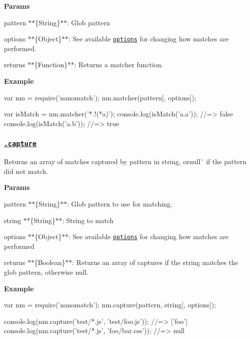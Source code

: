 {\bfseries Params}


\begin{DoxyItemize}
\item {\ttfamily pattern} $\ast$$\ast$\{String\}$\ast$$\ast$\+: Glob pattern
\item {\ttfamily options} $\ast$$\ast$\{Object\}$\ast$$\ast$\+: See available \href{#options}{\tt options} for changing how matches are performed.
\item {\ttfamily returns} $\ast$$\ast$\{Function\}$\ast$$\ast$\+: Returns a matcher function.
\end{DoxyItemize}

{\bfseries Example}


\begin{DoxyCode}
var nm = require('nanomatch');
nm.matcher(pattern[, options]);

var isMatch = nm.matcher('*.!(*a)');
console.log(isMatch('a.a'));
//=> false
console.log(isMatch('a.b'));
//=> true
\end{DoxyCode}


\subsubsection*{\href{index.js#L560}{\tt .capture}}

Returns an array of matches captured by {\ttfamily pattern} in {\ttfamily string, or}null\`{} if the pattern did not match.

{\bfseries Params}


\begin{DoxyItemize}
\item {\ttfamily pattern} $\ast$$\ast$\{String\}$\ast$$\ast$\+: Glob pattern to use for matching.
\item {\ttfamily string} $\ast$$\ast$\{String\}$\ast$$\ast$\+: String to match
\item {\ttfamily options} $\ast$$\ast$\{Object\}$\ast$$\ast$\+: See available \href{#options}{\tt options} for changing how matches are performed
\item {\ttfamily returns} $\ast$$\ast$\{Boolean\}$\ast$$\ast$\+: Returns an array of captures if the string matches the glob pattern, otherwise {\ttfamily null}.
\end{DoxyItemize}

{\bfseries Example}


\begin{DoxyCode}
var nm = require('nanomatch');
nm.capture(pattern, string[, options]);

console.log(nm.capture('test/*.js', 'test/foo.js'));
//=> ['foo']
console.log(nm.capture('test/*.js', 'foo/bar.css'));
//=> null
\end{DoxyCode}


